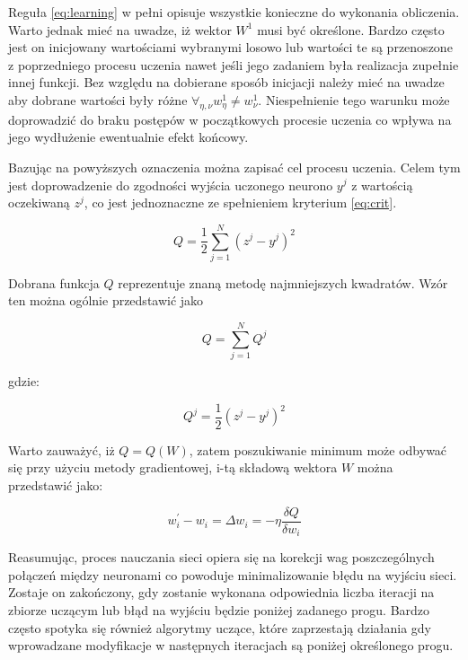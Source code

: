 Reguła \ref{eq:learning} w pełni opisuje wszystkie konieczne do wykonania obliczenia. Warto jednak mieć na uwadze, iż wektor $W^{1}$ musi być określone. Bardzo często jest on inicjowany wartościami wybranymi losowo lub wartości te są przenoszone z poprzedniego procesu uczenia nawet jeśli jego zadaniem była realizacja zupełnie innej funkcji.
Bez względu na dobierane sposób inicjacji należy mieć na uwadze aby dobrane wartości były różne $\forall_{\eta, \nu} w^{1}_{\eta} \neq w^{1}_{\nu} $. Niespełnienie tego warunku może doprowadzić do braku postępów w początkowych procesie uczenia co wpływa na jego wydłużenie ewentualnie efekt końcowy. 

Bazując na powyższych oznaczenia można zapisać cel procesu uczenia. Celem tym jest doprowadzenie do zgodności wyjścia uczonego neurono $y^{j}$ z wartością oczekiwaną $z^{j}$, co jest jednoznaczne ze spełnieniem kryterium \ref{eq:crit}.

\begin{equation}
Q = \frac{1}{2} \sum_{j = 1}^{N} (z^{j} - y^{j})^{2}
\label{eq:crit}
\end{equation}

Dobrana funkcja $Q$ reprezentuje znaną metodę najmniejszych kwadratów.
Wzór ten można ogólnie przedstawić jako

\begin{equation}
Q = \sum_{j = 1}^{N} Q^{j}
\label{eq:common_crit}
\end{equation}

gdzie:

\begin{equation}
Q^{j} = \frac{1}{2}(z^{j} - y^{j})^{2}
\label{eq:condition_crit}
\end{equation}

Warto zauważyć, iż $Q = Q(W)$, zatem poszukiwanie minimum może odbywać się przy użyciu metody gradientowej, i-tą składową wektora $W$ można przedstawić jako:

\begin{equation}
w^{'}_i - w_{i} = \Delta w_{i} = - \eta \frac{\delta Q}{\delta w_{i}}
\label{eq:delta_member}
\end{equation}


Reasumując, proces nauczania sieci opiera się na korekcji wag poszczególnych połączeń między neuronami co powoduje minimalizowanie błędu na wyjściu sieci. Zostaje on zakończony, gdy zostanie wykonana odpowiednia liczba iteracji na zbiorze uczącym lub błąd na wyjściu będzie poniżej zadanego progu. Bardzo często spotyka się również algorytmy uczące, które zaprzestają działania gdy wprowadzane modyfikacje w następnych iteracjach są poniżej określonego progu.



